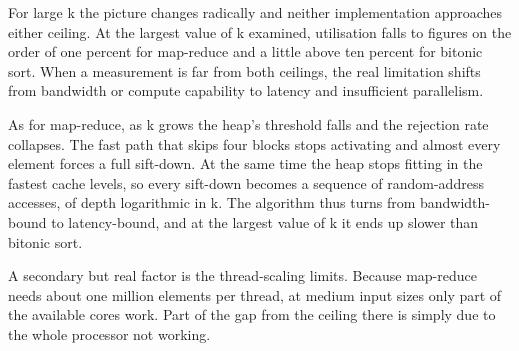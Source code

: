 For large k the picture changes radically and neither implementation approaches
either ceiling. At the largest value of k examined, utilisation falls to
figures on the order of one percent for map-reduce and a little above ten
percent for bitonic sort. When a measurement is far from both ceilings, the
real limitation shifts from bandwidth or compute capability to latency and
insufficient parallelism.

As for map-reduce, as k grows the heap's threshold falls and the rejection rate
collapses. The fast path that skips four blocks stops activating and almost
every element forces a full sift-down. At the same time the heap stops fitting
in the fastest cache levels, so every sift-down becomes a sequence of
random-address accesses, of depth logarithmic in k. The algorithm thus turns
from bandwidth-bound to latency-bound, and at the largest value of k it ends up
slower than bitonic sort.

A secondary but real factor is the thread-scaling limits. Because map-reduce
needs about one million elements per thread, at medium input sizes only part of
the available cores work. Part of the gap from the ceiling there is simply due
to the whole processor not working.
